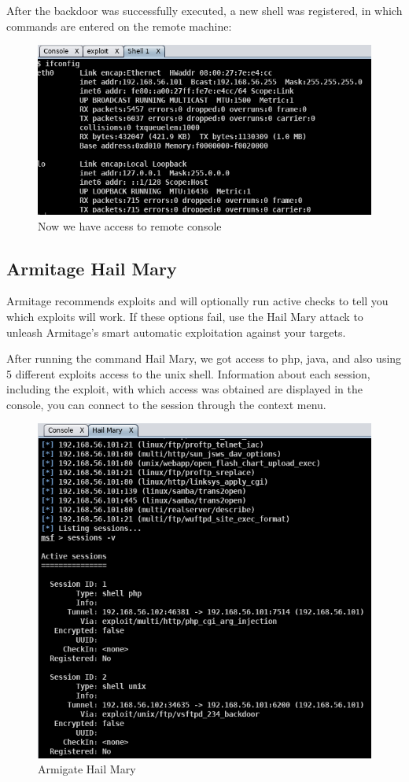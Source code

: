 \documentclass[14pt,a4paper,report]{report}
\begin{document}
After the backdoor was successfully executed, a new shell was registered, in which commands are entered on the remote machine:

\begin{figure}[h!]
	\centering
	\includegraphics[scale = 0.70]{images/9.png}
	\caption{Now we have access to remote console}
\end{figure}

\subsection{Armitage Hail Mary}

Armitage recommends exploits and will optionally run active checks to tell you which exploits will work. If these options fail, use the Hail Mary attack to unleash Armitage's smart automatic exploitation against your targets.

After running the command Hail Mary, we got access to php, java, and also using 5 different exploits access to the unix shell. Information about each session, including the exploit, with which access was obtained are displayed in the console, you can connect to the session through the context menu.

\begin{figure}[h!]
	\centering
	\includegraphics[scale = 0.75]{images/10.png}
	\caption{Armigate Hail Mary}
\end{figure}
\end{document}
